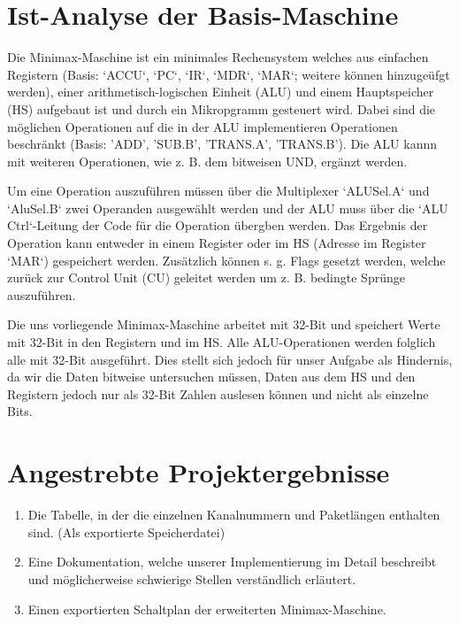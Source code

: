 \documentclass[12pt,titlepage]{article}
\begin{document}
\section{Ist-Analyse der Basis-Maschine}

Die Minimax-Maschine ist ein minimales Rechensystem welches aus einfachen Registern (Basis: `ACCU`, `PC`, `IR`, `MDR`, `MAR`;
weitere können hinzugeüfgt werden), einer arithmetisch-logischen Einheit (ALU) und einem Hauptspeicher (HS) aufgebaut
ist und durch ein Mikropgramm gesteuert wird. Dabei sind die möglichen Operationen auf die in der ALU implementieren
Operationen beschränkt (Basis: 'ADD', 'SUB.B', 'TRANS.A', 'TRANS.B'). Die ALU kannn mit weiteren Operationen,
wie z. B. dem bitweisen UND, ergänzt werden.


Um eine Operation auszuführen müssen über die Multiplexer `ALUSel.A` und `AluSel.B` zwei Operanden ausgewählt werden
und der ALU muss über die `ALU Ctrl`-Leitung der Code für die Operation übergben werden. Das Ergebnis der Operation kann
entweder in einem Register oder im HS (Adresse im Register `MAR`) gespeichert werden. Zusätzlich können s. g. Flags 
gesetzt werden, welche zurück zur Control Unit (CU) geleitet werden um z. B. bedingte Sprünge auszuführen.


Die uns vorliegende Minimax-Maschine arbeitet mit 32-Bit und speichert Werte mit 32-Bit in den Registern und im HS.
Alle ALU-Operationen werden folglich alle mit 32-Bit ausgeführt. Dies stellt sich jedoch für unser Aufgabe als
Hindernis, da wir die Daten bitweise untersuchen müssen, Daten aus dem HS und den Registern jedoch nur als
32-Bit Zahlen auslesen können und nicht als einzelne Bits.

\section{Angestrebte Projektergebnisse}
\begin{enumerate}
\item Die Tabelle, in der die einzelnen Kanalnummern und Paketlängen enthalten sind. (Als exportierte Speicherdatei)
\item Eine Dokumentation, welche unserer Implementierung im Detail beschreibt und m{\"o}glicherweise schwierige Stellen verst{\"a}ndlich erl{\"a}utert.
\item Einen exportierten Schaltplan der erweiterten Minimax-Maschine.
\end{enumerate}
\end{document}
